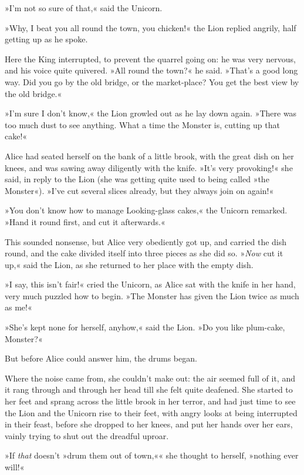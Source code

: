 »I'm not so sure of that,« said the Unicorn.

»Why, I beat you all round the town, you chicken!« the Lion replied angrily, half getting up as he spoke.

Here the King interrupted, to prevent the quarrel going on: he was very nervous, and his voice quite quivered. »All round the town?« he said. »That's a good long way. Did you go by the old bridge, or the market-place? You get the best view by the old bridge.«

»I'm sure I don't know,« the Lion growled out as he lay down again. »There was too much dust to see anything. What a time the Monster is, cutting up that cake!«

Alice had seated herself on the bank of a little brook, with the great dish on her knees, and was sawing away diligently with the knife. »It's very provoking!« she said, in reply to the Lion (she was getting quite used to being called »the Monster«). »I've cut several slices already, but they always join on again!«

»You don't know how to manage Looking-glass cakes,« the Unicorn remarked. »Hand it round first, and cut it afterwards.«

This sounded nonsense, but Alice very obediently got up, and carried the dish round, and the cake divided itself into three pieces as she did so. »\textit{Now} cut it up,« said the Lion, as she returned to her place with the empty dish.

»I say, this isn't fair!« cried the Unicorn, as Alice sat with the knife in her hand, very much puzzled how to begin. »The Monster has given the Lion twice as much as me!«

»She's kept none for herself, anyhow,« said the Lion. »Do you like plum-cake, Monster?«

But before Alice could answer him, the drums began.

Where the noise came from, she couldn't make out: the air seemed full of it, and it rang through and through her head till she felt quite deafened. She started to her feet and sprang across the little brook in her terror, and had just time to see the Lion and the Unicorn rise to their feet, with angry looks at being interrupted in their feast, before she dropped to her knees, and put her hands over her ears, vainly trying to shut out the dreadful uproar.

»If \textit{that} doesn't »drum them out of town,«« she thought to herself, »nothing ever will!«
